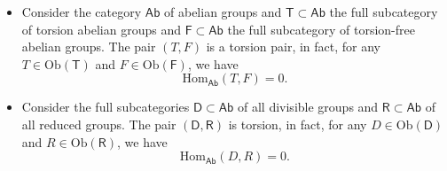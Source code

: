 \begin{ex}\leavevmode\vspace{-.2\baselineskip}
	\begin{itemize}
		\item Consider the category $\mathsf{Ab}$ of abelian groups and $\mathsf{T} \subset \mathsf{Ab}$ the full subcategory of torsion abelian groups and $\mathsf{F} \subset \mathsf{Ab}$ the full subcategory of torsion-free abelian groups.
			The pair $\left(T, F\right)$ is a torsion pair, in fact, for any $T \in \mathrm{Ob} \left(\mathsf{T}\right)$ and $F \in \mathrm{Ob} \left(\mathsf{F}\right)$, we have
			\begin{equation}
			\mathrm{Hom}_{\mathsf{Ab}} \left( T, F \right) = 0
			.\end{equation} 
		\item Consider the full subcategories $\mathsf{D} \subset \mathsf{Ab}$ of all divisible groups and $\mathsf{R} \subset \mathsf{Ab}$ of all reduced groups.
			The pair $\left(\mathsf{D}, \mathsf{R}\right)$ is torsion, in fact, for any $D \in \mathrm{Ob} \left(\mathsf{D}\right)$ and $R \in \mathrm{Ob} \left(\mathsf{R}\right)$, we have
			\begin{equation}
			\mathrm{Hom}_{\mathsf{Ab}} \left( D, R \right) = 0
			.\end{equation} 
	\end{itemize}
\end{ex} 

